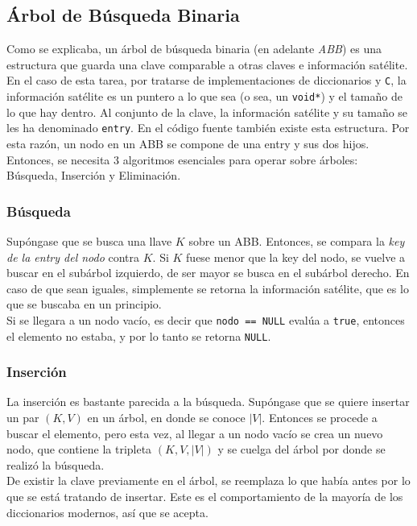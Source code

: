 \documentclass[12pt,letterpaper]{report}
\begin{document}
\subsection{Árbol de Búsqueda Binaria}
\label{subsec:marco_abb}
Como se explicaba, un árbol de búsqueda binaria (en adelante \emph{ABB}) es una estructura que guarda una clave comparable a otras claves e información satélite. En el caso de esta tarea, por tratarse de implementaciones de diccionarios y \texttt{C}, la información satélite es un puntero a lo que sea (o sea, un \texttt{void*}) y el tamaño de lo que hay dentro. Al conjunto de la clave, la información satélite y su tamaño se les ha denominado \texttt{entry}. En el código fuente también existe esta estructura. Por esta razón, un nodo en un ABB se compone de una entry y sus dos hijos.\\

Entonces, se necesita 3 algoritmos esenciales para operar sobre árboles: Búsqueda, Inserción y Eliminación.

\subsubsection{Búsqueda}
Supóngase que se busca una llave $K$ sobre un ABB. Entonces, se compara la \emph{key de la entry del nodo} contra $K$. Si $K$ fuese menor que la key del nodo, se vuelve a buscar en el subárbol izquierdo, de ser mayor se busca en el subárbol derecho. En caso de que sean iguales, simplemente se retorna la información satélite, que es lo que se buscaba en un principio.\\

Si se llegara a un nodo vacío, es decir que \texttt{nodo == NULL} evalúa a \texttt{true}, entonces el elemento no estaba, y por lo tanto se retorna \texttt{NULL}.

\subsubsection{Inserción}
La inserción es bastante parecida a la búsqueda. Supóngase que se quiere insertar un par $(K,V)$ en un árbol, en donde se conoce $|V|$. Entonces se procede a buscar el elemento, pero esta vez, al llegar a un nodo vacío se crea un nuevo nodo, que contiene la tripleta $(K, V, |V|)$ y se cuelga del árbol por donde se realizó la búsqueda.\\

De existir la clave previamente en el árbol, se reemplaza lo que había antes por lo que se está tratando de insertar. Este es el comportamiento de la mayoría de los diccionarios modernos, así que se acepta.
\end{document}
